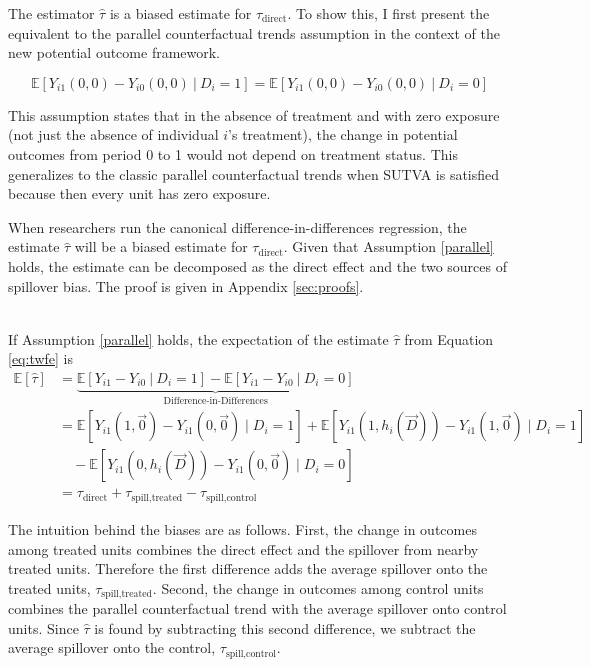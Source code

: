 \documentclass[11pt]{article}
\begin{document}
The estimator $\hat{\tau}$ is a biased estimate for $\tau_{\text{direct}}$. To show this, I first present the equivalent to the parallel counterfactual trends assumption in the context of the new potential outcome framework. 

\begin{assumption}\label{parallel}
    \[ 
        \mathbb{E}\left[ Y_{i1}(0, 0) - Y_{i0}(0, 0) \ \vert \ D_i = 1 \right] = 
        \mathbb{E}\left[ Y_{i1}(0, 0) - Y_{i0}(0, 0) \ \vert \ D_i = 0 \right]
    \]
\end{assumption}
This assumption states that in the absence of treatment and with zero exposure (not just the absence of individual $i$'s treatment), the change in potential outcomes from period 0 to 1 would not depend on treatment status. This generalizes to the classic parallel counterfactual trends when SUTVA is satisfied because then every unit has zero exposure.

When researchers run the canonical difference-in-differences regression, 
the estimate $\hat{\tau}$ will be a biased estimate for $\tau_{\text{direct}}$. Given that Assumption \ref{parallel} holds, the estimate can be decomposed as the direct effect and the two sources of spillover bias. The proof is given in Appendix \ref{sec:proofs}.

\begin{theorem}\label{thm:bias}\ \\    
    If Assumption \ref{parallel} holds, the expectation of the estimate $\hat{\tau}$ from Equation \ref{eq:twfe} is
    \begin{align*}
        \mathbb{E}[\hat{\tau}] &= \underbrace{\mathbb{E}\left[ Y_{i1} - Y_{i0} \ \vert \ D_i = 1 \right] - \mathbb{E}\left[ Y_{i1} - Y_{i0} \ \vert \ D_i = 0 \right]}_{\text{Difference-in-Differences}} \\ 
        &= 
        \mathbb{E} \left[ Y_{i1}(1, \vec{0}) - Y_{i1}(0, \vec{0}) \mid D_i = 1 \right] + \mathbb{E} \left[ Y_{i1}(1, h_i(\vec{D})) - Y_{i1}(1, \vec{0}) \mid D_i = 1 \right] \\
        &\quad - \mathbb{E} \left[ Y_{i1}(0, h_i(\vec{D})) - Y_{i1}(0, \vec{0}) \mid D_i = 0 \right] \\
        &= \tau_{\text{direct}} + \tau_{\text{spill,treated}} - \tau_{\text{spill,control}}
    \end{align*}
\end{theorem}

The intuition behind the biases are as follows. First, the change in outcomes among treated units combines the direct effect and the spillover from nearby treated units. Therefore the first difference adds the average spillover onto the treated units, $\tau_{\text{spill,treated}}$. Second, the change in outcomes among control units combines the parallel counterfactual trend with the average spillover onto control units. Since $\hat{\tau}$ is found by subtracting this second difference, we subtract the average spillover onto the control, $\tau_{\text{spill,control}}$. 
\end{document}
